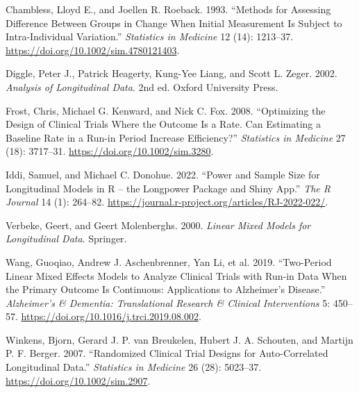 \documentclass[
  11pt,
]{article}
\newlength{\cslhangindent}
\newenvironment{CSLReferences}[2] %
 {\begin{list}{}{%
  \setlength{\itemindent}{0pt}
  \setlength{\leftmargin}{0pt}
  \setlength{\parsep}{0pt}
  \ifodd #1
   \setlength{\leftmargin}{\cslhangindent}
   \setlength{\itemindent}{-1\cslhangindent}
  \fi
  \setlength{\itemsep}{#2\baselineskip}}}
 {\end{list}}
\begin{document}
\protect{}\label{refs}
\begin{CSLReferences}{1}{1}
Chambless, Lloyd E., and Joellen R. Roeback. 1993. {``Methods for
Assessing Difference Between Groups in Change When Initial Measurement
Is Subject to Intra-Individual Variation.''} \emph{Statistics in
Medicine} 12 (14): 1213--37.
\url{https://doi.org/10.1002/sim.4780121403}.

Diggle, Peter J., Patrick Heagerty, Kung-Yee Liang, and Scott L. Zeger.
2002. \emph{Analysis of Longitudinal Data}. 2nd ed. Oxford University
Press.

Frost, Chris, Michael G. Kenward, and Nick C. Fox. 2008. {``Optimizing
the Design of Clinical Trials Where the Outcome Is a Rate. {Can}
Estimating a Baseline Rate in a Run-in Period Increase Efficiency?''}
\emph{Statistics in Medicine} 27 (18): 3717--31.
\url{https://doi.org/10.1002/sim.3280}.

Iddi, Samuel, and Michael C. Donohue. 2022. {``Power and Sample Size for
Longitudinal Models in {R} -- the Longpower Package and {Shiny} App.''}
\emph{The R Journal} 14 (1): 264--82.
\url{https://journal.r-project.org/articles/RJ-2022-022/}.

Verbeke, Geert, and Geert Molenberghs. 2000. \emph{Linear Mixed Models
for Longitudinal Data}. Springer.

Wang, Guoqiao, Andrew J. Aschenbrenner, Yan Li, et al. 2019.
{``Two-Period Linear Mixed Effects Models to Analyze Clinical Trials
with Run-in Data When the Primary Outcome Is Continuous: {Applications}
to {Alzheimer's} Disease.''} \emph{Alzheimer's \& Dementia:
Translational Research \& Clinical Interventions} 5: 450--57.
\url{https://doi.org/10.1016/j.trci.2019.08.002}.

Winkens, Bjorn, Gerard J. P. van Breukelen, Hubert J. A. Schouten, and
Martijn P. F. Berger. 2007. {``Randomized Clinical Trial Designs for
Auto-Correlated Longitudinal Data.''} \emph{Statistics in Medicine} 26
(28): 5023--37. \url{https://doi.org/10.1002/sim.2907}.

\end{CSLReferences}
\end{document}
